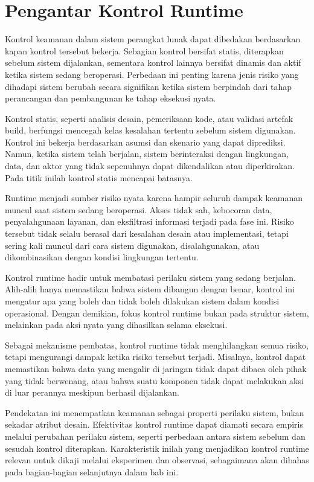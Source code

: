 \section{Pengantar Kontrol Runtime}

Kontrol keamanan dalam sistem perangkat lunak dapat dibedakan berdasarkan kapan kontrol tersebut bekerja. Sebagian kontrol bersifat statis, diterapkan sebelum sistem dijalankan, sementara kontrol lainnya bersifat dinamis dan aktif ketika sistem sedang beroperasi. Perbedaan ini penting karena jenis risiko yang dihadapi sistem berubah secara signifikan ketika sistem berpindah dari tahap perancangan dan pembangunan ke tahap eksekusi nyata.

Kontrol statis, seperti analisis desain, pemeriksaan kode, atau validasi artefak build, berfungsi mencegah kelas kesalahan tertentu sebelum sistem digunakan. Kontrol ini bekerja berdasarkan asumsi dan skenario yang dapat diprediksi. Namun, ketika sistem telah berjalan, sistem berinteraksi dengan lingkungan, data, dan aktor yang tidak sepenuhnya dapat dikendalikan atau diperkirakan. Pada titik inilah kontrol statis mencapai batasnya.

Runtime menjadi sumber risiko nyata karena hampir seluruh dampak keamanan muncul saat sistem sedang beroperasi. Akses tidak sah, kebocoran data, penyalahgunaan layanan, dan eksfiltrasi informasi terjadi pada fase ini. Risiko tersebut tidak selalu berasal dari kesalahan desain atau implementasi, tetapi sering kali muncul dari cara sistem digunakan, disalahgunakan, atau dikombinasikan dengan kondisi lingkungan tertentu.

Kontrol runtime hadir untuk membatasi perilaku sistem yang sedang berjalan. Alih-alih hanya memastikan bahwa sistem dibangun dengan benar, kontrol ini mengatur apa yang boleh dan tidak boleh dilakukan sistem dalam kondisi operasional. Dengan demikian, fokus kontrol runtime bukan pada struktur sistem, melainkan pada aksi nyata yang dihasilkan selama eksekusi.

Sebagai mekanisme pembatas, kontrol runtime tidak menghilangkan semua risiko, tetapi mengurangi dampak ketika risiko tersebut terjadi. Misalnya, kontrol dapat memastikan bahwa data yang mengalir di jaringan tidak dapat dibaca oleh pihak yang tidak berwenang, atau bahwa suatu komponen tidak dapat melakukan aksi di luar perannya meskipun berhasil dijalankan.

Pendekatan ini menempatkan keamanan sebagai properti perilaku sistem, bukan sekadar atribut desain. Efektivitas kontrol runtime dapat diamati secara empiris melalui perubahan perilaku sistem, seperti perbedaan antara sistem sebelum dan sesudah kontrol diterapkan. Karakteristik inilah yang menjadikan kontrol runtime relevan untuk dikaji melalui eksperimen dan observasi, sebagaimana akan dibahas pada bagian-bagian selanjutnya dalam bab ini.


